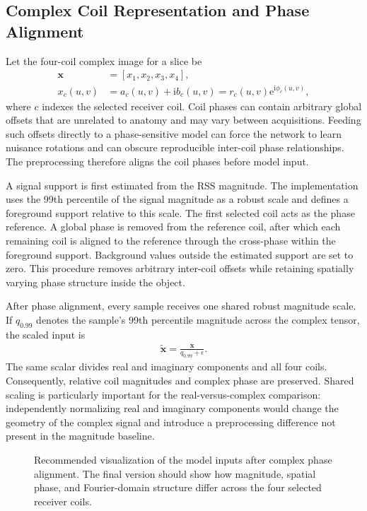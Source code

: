 \documentclass[journal]{IEEEtran}
\begin{document}
\subsection{Complex Coil Representation and Phase Alignment}
Let the four-coil complex image for a slice be
\begin{align}
\mathbf{x} &= [x_1,x_2,x_3,x_4], \\
x_c(u,v) &= a_c(u,v)+\mathrm{i}b_c(u,v)
           = r_c(u,v)\mathrm{e}^{\mathrm{i}\phi_c(u,v)},
\end{align}
where $c$ indexes the selected receiver coil. Coil phases can contain arbitrary global offsets that are unrelated to anatomy and may vary between acquisitions. Feeding such offsets directly to a phase-sensitive model can force the network to learn nuisance rotations and can obscure reproducible inter-coil phase relationships. The preprocessing therefore aligns the coil phases before model input.

A signal support is first estimated from the \ac{RSS} magnitude. The implementation uses the 99th percentile of the signal magnitude as a robust scale and defines a foreground support relative to this scale. The first selected coil acts as the phase reference. A global phase is removed from the reference coil, after which each remaining coil is aligned to the reference through the cross-phase within the foreground support. Background values outside the estimated support are set to zero. This procedure removes arbitrary inter-coil offsets while retaining spatially varying phase structure inside the object.

After phase alignment, every sample receives one shared robust magnitude scale. If $q_{0.99}$ denotes the sample's 99th percentile magnitude across the complex tensor, the scaled input is
\begin{align}
\tilde{\mathbf{x}} = \frac{\mathbf{x}}{q_{0.99}+\epsilon}.
\end{align}
The same scalar divides real and imaginary components and all four coils. Consequently, relative coil magnitudes and complex phase are preserved. Shared scaling is particularly important for the real-versus-complex comparison: independently normalizing real and imaginary components would change the geometry of the complex signal and introduce a preprocessing difference not present in the magnitude baseline.

\begin{figure}[t]
\centering
{}
\caption{\small Recommended visualization of the model inputs after complex phase alignment. The final version should show how magnitude, spatial phase, and Fourier-domain structure differ across the four selected receiver coils.}
\label{fig:complexinput}
\end{figure}
\end{document}
